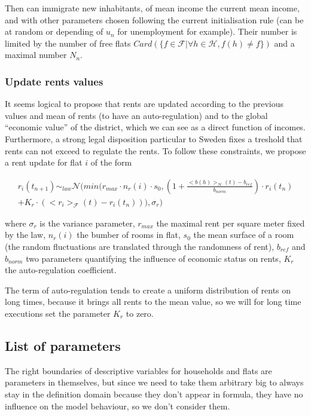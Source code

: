 \documentclass[english]{article}
\begin{document}
Then can immigrate new inhabitants, of mean income the current mean
income, and with other parameters chosen following the current initialisation
rule (can be at random or depending of $u_{n}$ for unemployment for
example). Their number is limited by the number of free flats $Card(\{f\in\mathcal{F}|\forall h\in\mathcal{H},f(h)\neq f\})$
and a maximal number $N_{n}$.


\subsubsection{Update rents values}

It seems logical to propose that rents are updated according to the
previous values and mean of rents (to have an auto-regulation) and
to the global ``economic value'' of the district, which we can see
as a direct function of incomes. Furthermore, a strong legal disposition
particular to Sweden fixes a treshold that rents can not exceed to
regulate the rents. To follow these constraints, we propose a rent
update for flat $i$ of the form

\[
\begin{array}{c}
r_{i}(t_{n+1})\sim_{law}\mathcal{N}(min(r_{max}\cdot n_{r}(i)\cdot s_{0},(1+\frac{<b(h)>_{\mathcal{H}}(t)-b_{ref}}{b_{norm}})\cdot r_{i}(t_{n})\\
+K_{r}\cdot(<r_{i}>_{\mathcal{F}}(t)-r_{i}(t_{n}))),\sigma_{r})
\end{array}
\]


where $\sigma_{r}$ is the variance parameter, $r_{max}$ the maximal
rent per square meter fixed by the law, $n_{r}(i)$ the bumber of
rooms in flat, $s_{0}$ the mean surface of a room (the random fluctuations
are translated through the randomness of rent), $b_{ref}$ and $b_{norm}$
two parameters quantifying the influence of economic status on rents,
$K_{r}$ the auto-regulation coefficient.

The term of auto-regulation tends to create a uniform distribution
of rents on long times, because it brings all rents to the mean value,
so we will for long time executions set the parameter $K_{r}$ to
zero.


\subsection{List of parameters}

The right boundaries of descriptive variables for households and flats
are parameters in themselves, but since we need to take them arbitrary
big to always stay in the definition domain because they don't appear
in formula, they have no influence on the model behaviour, so we don't
consider them.
\end{document}
